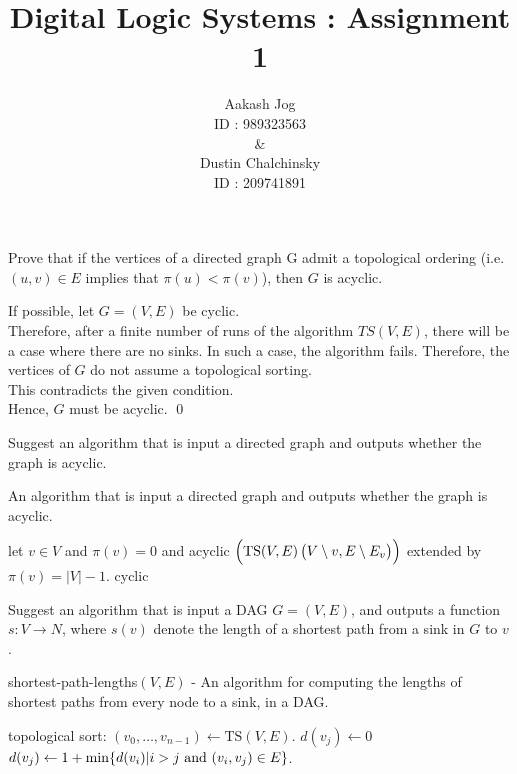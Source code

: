 \documentclass[fleqn, a4paper, 12pt, oneside]{amsart}
\title{Digital Logic Systems : Assignment 1}
\author{
	Aakash Jog\\
	ID : 989323563\\
	\&\\
	Dustin Chalchinsky\\
	ID : 209741891
	}
\date{\formatdate{24}{3}{2015}}
\theoremstyle{definition}
\theoremstyle{theorem}
\begin{document}
	
\maketitle

\begin{question}
	Prove that if the vertices of a directed graph G admit a topological ordering (i.e. $(u, v) \in E$ implies that  $\pi(u) < \pi(v)$), then $G$ is acyclic.
\end{question}

\begin{solution}
	If possible, let $G = (V, E)$ be cyclic.\\
	Therefore, after a finite number of runs of the algorithm $TS(V,E)$, there will be a case where there are no sinks.
	In such a case, the algorithm fails.
	Therefore, the vertices of $G$ do not assume a topological sorting.\\
	This contradicts the given condition.\\
	Hence, $G$ must be acyclic.
	\qed
\end{solution}

\begin{question}
	Suggest an algorithm that is input a directed graph and outputs whether the graph is acyclic.
\end{question}

\begin{algorithm}
	\caption{An algorithm that is input a directed graph and outputs whether the graph is acyclic.}
	\begin{algorithmic}
			\State let $v \in V$ and \Return $\pi(v) = 0$ 
			and 
			\Return acyclic
			\State \Return $\left( \textnormal{TS}(V,E) \left( V \setminus v, E \setminus E_v \right) \right)$ extended by $\pi(v) = |V| - 1$.
		\Else
			\State \Return cyclic
		\EndIf
	\end{algorithmic}
\end{algorithm}

\begin{question}
	Suggest an algorithm that is input a DAG $G = (V, E)$, and outputs a function $s : V \to N$, where $s(v)$ denote the length of a shortest path from a sink in $G$ to $v$.
\end{question}

\begin{solution}
	\begin{algorithm}
		\caption{shortest-path-lengths$(V,E)$ - An algorithm for computing the lengths of shortest paths from every node to a sink, in a DAG.}
		\begin{algorithmic}
			\item topological sort: $(v_0,\dots, v_{n - 1}) \gets \mathrm{TS}(V, E)$.
			\For {$j = 0$ to $(n - 1)$}
				\If {$v_j$ is a sink}
					\State $d(v_j) \gets 0$
				\Else 
					\State $d(v_j) \gets 1 + \min \{ d(v_i) | i > j \textnormal{ and } (v_i,v_j) \in E \}$.
				\EndIf
			\EndFor
		\end{algorithmic}
	\end{algorithm}
\end{solution}
\end{document}
